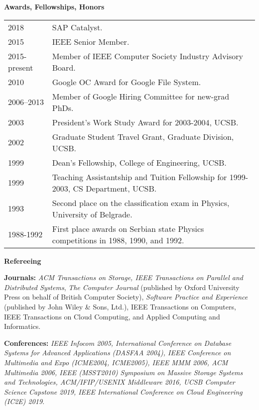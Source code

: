 \documentclass[10pt]{article}
\renewcommand{\section}[1]{ \vspace{10pt}\begin{flushleft}{\hspace{-0.2in }\Large\bf
    #1}\end{flushleft}\nopagebreak }
\begin{document}
\section{Awards, Fellowships, Honors}
\begin{tabular}{ll}
2018 	& SAP Catalyst. \\
2015 	& IEEE Senior Member. \\
2015-present 	& Member of IEEE Computer Society Industry Advisory Board. \\
2010 	& Google OC Award for Google File System. \\
2006--2013      & Member of Google Hiring Committee for new-grad PhDs.\\
2003 	& President's Work Study Award for 2003-2004, UCSB. \\
2002	& Graduate Student Travel Grant, Graduate Division, UCSB.\\
1999 	& Dean's Fellowship, College of Engineering, UCSB. \\
1999 	& Teaching Assistantship and Tuition Fellowship for 1999-2003, 
		CS Department, UCSB. \\
1993 	& Second place on the classification exam in Physics, University of Belgrade. \\
1988-1992 & First place awards on Serbian state Physics competitions in 
		1988, 1990, and 1992.
\end{tabular}


\section{Refereeing}

{\bf Journals:}
{\em ACM Transactions on Storage, IEEE Transactions on Parallel and Distributed Systems},
{\em The Computer Journal} (published by Oxford University Press on behalf of
British Computer Society), {\em Software Practice and Experience}
(published by John Wiley \& Sons, Ltd.), IEEE Transactions on Computers, 
IEEE Transactions on Cloud Computing, and Applied Computing and Informatics.

{\bf Conferences:}
{\em IEEE Infocom 2005, International Conference on Database Systems for
Advanced Applications (DASFAA 2004), IEEE Conference on Multimedia and
Expo (ICME2004, ICME2005), IEEE MMM 2006, ACM Multimedia 2006, IEEE (MSST2010) Symposium on 
Massive Storage Systems and Technologies, ACM/IFIP/USENIX Middleware 2016, UCSB Computer Science Capstone 2019,
IEEE International Conference on Cloud Engineering (IC2E) 2019}.
\end{document}
